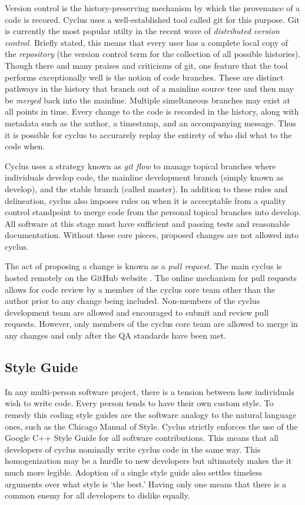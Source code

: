 Version control is the history-preserving mechanism by which the provenance of 
a code is recored. Cyclus uses a well-established tool called git 
\cite{software_freedom_conservancy_git_2014}
for this purpose. Git is currently the most popular utilty in the recent wave
of \emph{distributed version control}. Briefly stated, this means that every 
user has a complete local copy of the \emph{repository} (the version control
term for the collection of all possible histories).
Though there and many praises and criticisms of git, one 
feature that the tool performs exceptionally well is the notion of code branches.
These are distinct pathways in the history that branch out of a mainline source
tree and then may be \emph{merged} back into the mainline. Multiple simeltaneous
branches may exist at all points in time. Every change to the code is recorded
in the history, along with metadata such as the author, a timestamp, and an 
accompanying message. Thus 
it is possible for cyclus to accurarely replay the entirety of who did what to the
code when.

Cyclus uses a strategy known as \emph{git flow} 
\cite{kalliamvakou_code-centric_2014} 
to manage topical branches where individuals develop code, the mainline development
branch (simply known as develop), and the stable branch (called master).
In addition to these rules and delineation, cyclus also imposes rules on 
when it is accecptable from a quality control standpoint to merge code from 
the personal topical branches into develop. All software at this stage 
must have sufficient and passing tests and reasonable documentation. Without
these core pieces, proposed changes are not allowed into cyclus.

The act of proposing a change is known as a \emph{pull request}. The main cyclus is 
hosted remotely on the GitHub website \cite{dabbish_social_2012}. The online
mechanism for pull requests allows for code review by a member of the cyclus 
core team other than the author prior to any change being included. Non-members
of the cyclus development team are allowed and encouraged to submit and review 
pull requests. However, only members of the cyclus core team are allowed to 
merge in any changes and only after the QA standards have been met.

\subsection{Style Guide}

In any multi-person software project, there is a tension between how individuals
wish to write code. Every person tends to have their own custom style. To remedy this
coding style guides are the software analogy to the natural language ones, 
such as the Chicago Manual of Style. Cyclus strictly enforces the use of the 
Google C++ Style Guide \cite{weinberger_google_2008} for all software contributions.
This means that all developers of cyclus nominally write cyclus code in the same 
way.  This homogenization may be a hurdle to new developers but ultimately 
makes the it much more legible. Adoption of a single style guide also settles
timeless arguments over what style is `the best.' Having only one means that 
there is a common enemy for all developers to dislike equally.

